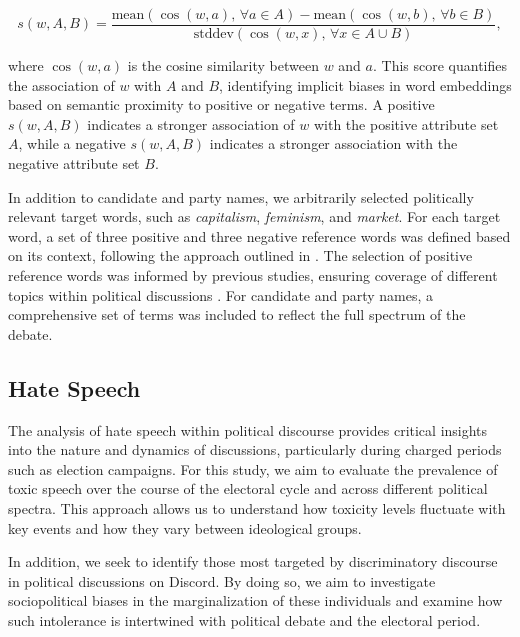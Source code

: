 \[
s(w, A, B) = 
\frac{\text{mean} \left( \cos(w, a), \, \forall a \in A \right) - \text{mean} \left( \cos(w, b), \, \forall b \in B \right)}{\text{stddev} \left( \cos(w, x), \, \forall x \in A \cup B \right)},
\]

\noindent
where \( \cos(w, a) \) is the cosine similarity between \( w \) and \( a \). This score quantifies the association of \( w \) with \( A \) and \( B \), identifying implicit biases in word embeddings based on semantic proximity to positive or negative terms. A positive \( s(w, A, B) \) indicates a stronger association of \( w \) with the positive attribute set \( A \), while a negative \( s(w, A, B) \) indicates a stronger association with the negative attribute set \( B \).

In addition to candidate and party names, we arbitrarily selected politically relevant target words, such as \textit{capitalism}, \textit{feminism}, and \textit{market}. For each target word, a set of three positive and three negative reference words was defined based on its context, following the approach outlined in \cite{ottoni2018analyzing}. The selection of positive reference words was informed by previous studies, ensuring coverage of different topics within political discussions \cite{magno2021measuring}. For candidate and party names, a comprehensive set of terms was included to reflect the full spectrum of the debate.

 

\subsection{Hate Speech}
\label{sec:hatespeech}

The analysis of hate speech within political discourse provides critical insights into the nature and dynamics of discussions, particularly during charged periods such as election campaigns. For this study, we aim to evaluate the prevalence of toxic speech over the course of the electoral cycle and across different political spectra. This approach allows us to understand how toxicity levels fluctuate with key events and how they vary between ideological groups.

In addition, we seek to identify those most targeted by discriminatory discourse in political discussions on Discord. By doing so, we aim to investigate sociopolitical biases in the marginalization of these individuals and examine how such intolerance is intertwined with political debate and the electoral period.


